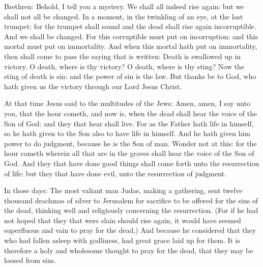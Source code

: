 \begin{multicols}{2}
\bigskip





Brethren: Behold, I tell you a mystery. We shall all indeed rise again: but
we shall not all be changed.
In a moment, in the twinkling of an eye, at the last trumpet: for
the trumpet shall sound and the dead shall rise again incorruptible. And
we shall be changed.
For this corruptible must put on incorruption: and this mortal
must put on immortality.
And when this mortal hath put on immortality, then shall come to
pass the saying that is written: Death is swallowed up in victory.
O death, where is thy victory? O death, where is thy sting?
Now the sting of death is sin: and the power of sin is the law.
But thanks be to God, who hath given us the victory through our
Lord Jesus Christ.




At that time Jesus said to the multitudes of the Jews:
Amen, amen, I say unto you, that the hour cometh, and now is, when
the dead shall hear the voice of the Son of God: and they that hear
shall live.
For as the Father hath life in himself, so he hath given to the
Son also to have life in himself.
And he hath given him power to do judgment, because he is the Son
of man.
Wonder not at this: for the hour cometh wherein all that are in
the graves shall hear the voice of the Son of God.
And they that have done good things shall come forth unto the
resurrection of life: but they that have done evil, unto the
resurrection of judgment.




In those days: The most valiant man Judas, making a gathering, sent twelve thousand drachmas of silver
to Jerusalem for sacrifice to be offered for the sins of the dead,
thinking well and religiously concerning the resurrection.
(For if he had not hoped that they that were slain should rise
again, it would have seemed superfluous and vain to pray for the dead,)
And because he considered that they who had fallen asleep with
godliness, had great grace laid up for them.
It is therefore a holy and wholesome thought to pray for the
dead, that they may be loosed from sins.



\end{multicols}
